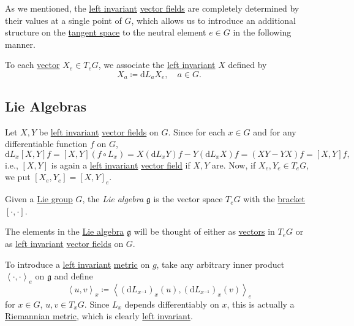 As we mentioned, the \hyperref[def:vector-field-left-invariant]{left invariant} \hyperref[def:vector-field]{vector fields} are completely determined by their values at a single point of \(G\), which allows us to introduce an additional structure on the \hyperref[def:tangent-space]{tangent space} to the neutral element \(e\in G\) in the following manner.

To each \hyperref[def:tangent-vector]{vector} \(X_e\in T_e G\), we associate the \hyperref[def:vector-field-left-invariant]{left invariant} \(X\) defined by
\[
	X_a \coloneqq \mathrm{d} L_a X_e,\quad a\in G.
\]

\subsection{Lie Algebras}
Let \(X, Y\) be \hyperref[def:vector-field-left-invariant]{left invariant} \hyperref[def:vector-field]{vector fields} on \(G\). Since for each \(x\in G\) and for any differentiable function \(f\) on \(G\),
\[
	\mathrm{d} L_x [X, Y] f = [X, Y](f \circ L_x) = X(\mathrm{d} L_x Y) f - Y(\mathrm{d} L_x X) f = (XY - YX) f = [X, Y]f,
\]
i.e., \([X, Y]\) is again a \hyperref[def:vector-field-left-invariant]{left invariant} \hyperref[def:vector-field]{vector field} if \(X, Y\) are. Now, if \(X_e, Y_e\in T_e G\), we put \([X_e, Y_e] = [X, Y]_e\).

\begin{definition}\label{def:Lie-algebra}
	Given a \hyperref[def:Lie-group]{Lie group} \(G\), the \emph{Lie algebra} \(\mathfrak{g}\) is the vector space \(T_e G\) with the \hyperref[def:bracket]{bracket} \([\cdot, \cdot]\).
\end{definition}

\begin{note}
	The elements in the \hyperref[def:Lie-algebra]{Lie algebra} \(\mathfrak{g}\) will be thought of either as \hyperref[def:tangent-vector]{vectors} in \(T_e G\) or as \hyperref[def:vector-field-left-invariant]{left invariant} \hyperref[def:vector-field]{vector fields} on \(G\).
\end{note}

To introduce a \hyperref[def:Riemannian-metric-left-invariant]{left invariant} \hyperref[def:Riemannian-metric]{metric} on \(g\), take any arbitrary inner product \(\left\langle \cdot, \cdot \right\rangle _e\) on \(\mathfrak{g} \) and define
\begin{equation}\label{eq:inner-product-on-Lie-algebra}
	\left\langle u, v \right\rangle _x \coloneqq \left\langle (\mathrm{d} L_{x ^{-1} })_x(u), (\mathrm{d} L_{x ^{-1} })_x(v) \right\rangle _e
\end{equation}
for \(x\in G\), \(u, v\in T_x G\). Since \(L_x\) depends differentiably on \(x\), this is actually a \hyperref[def:Riemannian-metric]{Riemannian metric}, which is clearly \hyperref[def:Riemannian-metric-left-invariant]{left invariant}.

